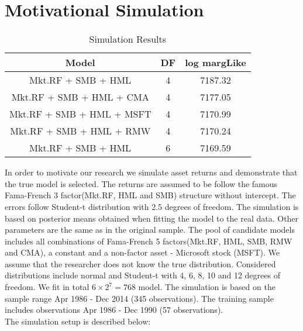 \documentclass[12pt]{article}
\begin{document}
\section{Motivational Simulation}
\begin{table}[ht]
	\centering
	\begin{tabular}{ccc}
		\hline
		Model & DF & log margLike \\ 
		\hline
		Mkt.RF + SMB + HML & 4 & 7187.32 \\ 
		Mkt.RF + SMB + HML + CMA & 4 & 7177.05 \\ 
		Mkt.RF + SMB + HML + MSFT & 4 & 7170.99 \\ 
		Mkt.RF + SMB + HML + RMW & 4 & 7170.24 \\ 
		Mkt.RF + SMB + HML & 6 & 7169.59 \\ 
		\hline
	\end{tabular}
	\caption{Simulation Results}
\end{table}
In order to motivate our research we simulate asset returns and demonstrate that the true model is selected. The returns are assumed to be follow the famous Fama-French 3 factor(Mkt.RF, HML and SMB) structure without intercept. The errors follow Student-t distribution with 2.5 degrees of freedom. The simulation is based on posterior means obtained when fitting the model to the real data. Other parameters are the same as in the original sample. The pool of candidate models includes all combinations of Fama-French 5 factors(Mkt.RF, HML, SMB, RMW and CMA), a constant and a non-factor asset - Microsoft stock (MSFT). We assume that the researcher does not know the true distribution. Considered distributions include normal and Student-t with 4, 6, 8, 10 and 12 degrees of freedom. We fit in total $6\times 2^{7} = 768$ model. The simulation is based on the sample range Apr 1986 - Dec 2014 (345 observations). The training sample includes observations Apr 1986 - Dec 1990 (57 observations). \\
The simulation setup is described below:
\end{document}
